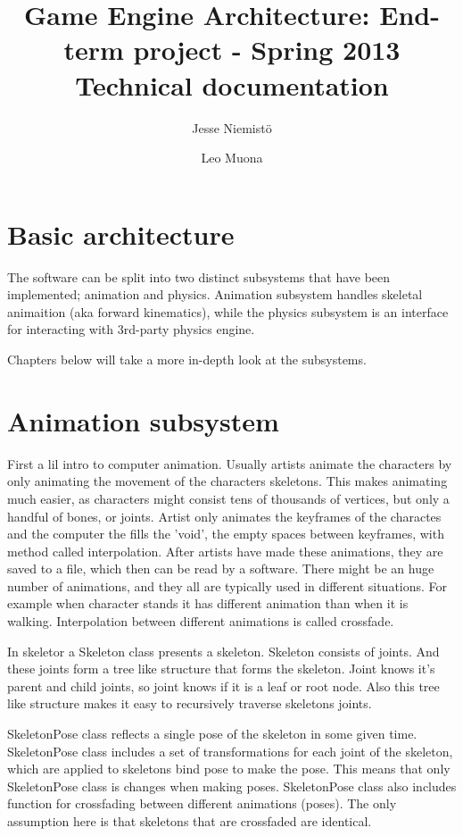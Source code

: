 \documentclass[11pt,twoside,a4paper]{article}
\begin{document}
\author{Jesse Niemistö \and Leo Muona}
\title{Game Engine Architecture: End-term project - Spring 2013 \\
       Technical documentation}

\maketitle

\section{Basic architecture}

The software can be split into two distinct subsystems that have been implemented; animation and physics. Animation subsystem handles skeletal animaition (aka forward kinematics), while the physics subsystem is an interface for interacting with 3rd-party physics engine.

Chapters below will take a more in-depth look at the subsystems.

\section{Animation subsystem}

First a lil intro to computer animation. Usually artists animate the characters by only animating the movement of the characters skeletons. This makes animating much easier, as characters might consist tens of thousands of vertices, but only a handful of bones, or joints. Artist only animates the keyframes of the charactes and the computer the fills the 'void', the empty spaces between keyframes, with method called interpolation. After artists have made these animations, they are saved to a file, which then can be read by a software. There might be an huge number of animations, and they all are typically used in different situations. For example when character stands it has different animation than when it is walking. Interpolation between different animations is called crossfade. 

In skeletor a Skeleton class presents a skeleton. Skeleton consists of joints. And these joints form a tree like structure that forms the skeleton. Joint knows it's parent and child joints, so joint knows if it is a leaf or root node. Also this tree like structure makes it easy to recursively traverse skeletons joints. 

SkeletonPose class reflects a single pose of the skeleton in some given time. SkeletonPose class includes a set of transformations for each joint of the skeleton, which are applied to skeletons bind pose to make the pose. This means that only SkeletonPose class is changes when making poses. SkeletonPose class also includes function for crossfading between different animations (poses). The only assumption here is that skeletons that are crossfaded are identical.
\end{document}
